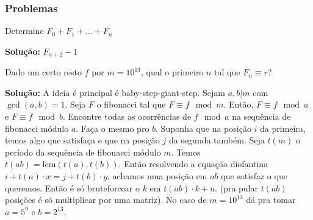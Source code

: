 \begin{table}[H]
\centering
\setlength{\tabcolsep}{0pt}
\end{table}




\subsubsection{Problemas}

 Determine $F_0 + F_1 + \dots + F_n$

\textbf{Solução:} $F_{n+2}-1$

 Dado um certo resto $f$ por $m=10^{13}$, qual o primeiro $n$ tal que $F_n \equiv r$?

\textbf{Solução:}  A ideia é principal é baby-step-giant-step. Sejam $a, b | m$ com $\gcd(a, b) = 1$. Seja $F$ o fibonacci tal que $F \equiv f \mod m$. Então, $F \equiv f \mod a$ e $F \equiv f \mod b$. Encontre todas as ocorrências de $f \mod a$ na sequência de fibonacci módulo $a$. Faça o mesmo pro $b$. Suponha que na posição $i$ da primeira, temos algo que satisfaça e que na posição $j$ da segunda também. Seja $t(m)$ o período da sequência de fibonacci módulo $m$. Temos $t(ab) = \text{lcm}(t(a), t(b))$. Então resolvendo a equação diofantina $i + t(a) \cdot x = j + t(b) \cdot y$, achamos uma posição em $ab$ que satisfaz o que queremos. Então é só bruteforcear o $k$ em $t(ab) \cdot k + u$. (pra pular $t(ab)$ posições é só multiplicar por uma matriz). No caso de $m=10^{13}$ dá pra tomar $a = 5^9$ e $b = 2^{13}$.
